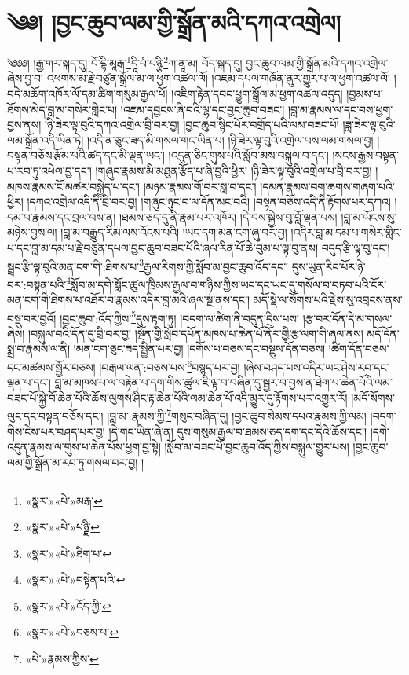 \chapter{༄༅། །བྱང་ཆུབ་ལམ་གྱི་སྒྲོན་མའི་དཀའ་འགྲེལ།}༄༅༅། །རྒྱ་གར་སྐད་དུ། བོ་དྷི་མཱརྒ་\footnote{«སྣར་»«པེ་»མརྒ་}དཱི་པཾ་པཉྩི་\footnote{«སྣར་»«པེ་»པཉྫི་}ཀ་ནཱ་མ། བོད་སྐད་དུ། བྱང་ཆུབ་ལམ་གྱི་སྒྲོན་མའི་དཀའ་འགྲེལ་ཞེས་བྱ་བ། འཕགས་མ་རྗེ་བཙུན་སྒྲོལ་མ་ལ་ཕྱག་འཚལ་ལོ། །འཇམ་དཔལ་གཞོན་ནུར་གྱུར་པ་ལ་ཕྱག་འཚལ་ལོ། །བདེ་མཆོག་འཁོར་ལོ་དམ་ཚིག་གསུམ་རྒྱལ་པོ། །འཇིག་རྟེན་དབང་ཕྱུག་སྒྲོལ་མ་ཕྱག་འཚལ་འདུད། །བྱམས་པ་ཐོགས་མེད་བླ་མ་གསེར་གླིང་པ། །འཇམ་དབྱངས་ཞི་བའི་ལྷ་དང་བྱང་ཆུབ་བཟང་། །བླ་མ་རྣམས་ལ་དང་བས་ཕྱག་བྱས་ནས། །ཉི་ཟེར་ལྟ་བུའི་དཀའ་འགྲེལ་བྲི་བར་བྱ། །བྱང་ཆུབ་སྙིང་པོར་བགྲོད་པའི་ལམ་བཟང་པོ། །ཟླ་ཟེར་ལྟ་བུའི་ལམ་སྒྲོན་འདི་ཡིན་ཏེ། །འདི་ན་ཅུང་ཟད་མི་གསལ་གང་ཡིན་པ། །ཉི་ཟེར་ལྟ་བུའི་འགྲེལ་པས་ལམ་གསལ་བྱ། །བསྟན་བཅོས་རྩོམ་པའི་ཚད་དང་མི་ལྡན་ཡང་། །འདུན་ཅིང་གུས་པའི་སློབ་མས་བསྐུལ་བ་དང་། །སངས་རྒྱས་བསྟན་པ་རབ་ཏུ་འཕེལ་བྱ་དང་། །གཞུང་རྣམས་མི་མཐུན་རྩོད་པ་ཞི་བྱའི་ཕྱིར། །ཉི་ཟེར་ལྟ་བུའི་འགྲེལ་པ་བྲི་བར་བྱ། །མཁས་རྣམས་ངོ་མཚར་བསྐྱེད་པ་དང་། །མཉམ་རྣམས་གོ་བར་སླ་བ་དང་། །དམན་རྣམས་བག་ཆགས་གཞག་པའི་ཕྱིར། །དཀའ་འགྲེལ་འདི་ནི་བྲི་བར་བྱ། །གཞུང་ཉུང་བ་ལ་དོན་མང་བའི། །བསྟན་བཅོས་འདི་ནི་རྟོགས་པར་དཀའ། །དམ་པ་རྣམས་དང་བྲལ་བས་ན། །ཐམས་ཅད་དུ་ནི་རྣམ་པར་འཁོར། །དེ་བས་སྐྱེས་བུ་བློ་ལྡན་པས། །བླ་མ་ཡོངས་སུ་མཉེས་བྱས་ལ། །བླ་མ་བརྒྱུད་རིམ་ལས་འོངས་པའི། །ཡང་དག་མན་ངག་ཞུ་བར་བྱ། །འདིར་བླ་མ་དམ་པ་གསེར་གླིང་པ་དང་བླ་མ་དམ་པ་རྗེ་བཙུན་དཔལ་བྱང་ཆུབ་བཟང་པོའི་ཞལ་རིན་པོ་ཆེ་བུམ་པ་ལྟ་བུ་ནས། བདུད་རྩི་ལྟ་བུ་དང་། སྦྲང་རྩི་ལྟ་བུའི་མན་ངག་གི་:ཐིགས་པ་\footnote{«སྣར་»«པེ་»ཐིག་པ་}རྒྱལ་རིགས་ཀྱི་སློབ་མ་བྱང་ཆུབ་འོད་དང་། དུས་ཡུན་རིང་པོར་ཉེ་བར་:བསྟན་པའི་\footnote{«སྣར་»«པེ་»བསྟེན་པའི་}སློབ་མ་དགེ་སློང་ཚུལ་ཁྲིམས་རྒྱལ་བ་གཉིས་ཀྱིས་ཡང་དང་ཡང་དུ་གསོལ་བ་བཏབ་པའི་ངོར་མན་ངག་གི་ཐིགས་པ་འཐོར་བ་རྣམས་འདིར་བླ་མའི་ཞལ་སྔ་ནས་དང་། མདོ་སྡེ་ལ་སོགས་པའི་རྗེས་སུ་འབྲངས་ནས་བསྡུ་བར་བྱའོ། །བྱང་ཆུབ་:འོད་ཀྱིས་\footnote{«སྣར་»«པེ་»འོད་ཀྱི་}དུས་རྟག་ཏུ། །བདག་ལ་ཚིག་ནི་བདུན་དྲིས་པས། །རྩ་བར་དོན་དེ་མ་གསལ་ཞེས། །བསྐུལ་བའི་དོན་དུ་བྲི་བར་བྱ། །སྔོན་གྱི་སློབ་དཔོན་མཁས་པ་ཆེན་པོ་ནོར་གྱི་རྩ་ལག་གི་ཞལ་ནས། མདོ་དོན་སྨྲ་བ་རྣམས་ལ་ནི། །མན་ངག་ཅུང་ཟད་སྦྱིན་པར་བྱ། །དགོས་པ་བཅས་དང་བསྡུས་དོན་བཅས། །ཚིག་དོན་བཅས་དང་མཚམས་སྦྱོར་བཅས། །བརྒལ་ལན་:བཅས་པས་\footnote{«སྣར་»«པེ་»བཅས་པ་}བསྙད་པར་བྱ། །ཞེས་བཤད་པས་འདིར་ཡང་ཤེས་རབ་དང་ལྡན་པ་དང་། བླ་མ་མཁས་པ་ལ་བརྟེན་པ་དག་གིས་ཚུལ་ཇི་ལྟ་བ་བཞིན་དུ་སྦྱར་བ་བྱས་ན་ཐེག་པ་ཆེན་པོའི་ལམ་བཟང་པོ་སྐྱེ་བོ་ཆེན་པོའི་ཆོས་ལུགས་ཤིང་རྟ་ཆེན་པོའི་ལམ་ཆེན་པོ་འདི་མྱུར་དུ་རྟོགས་པར་འགྱུར་རོ། །མདོ་སོགས་ལུང་དང་བསྟན་བཅོས་དང་། །བླ་མ་:རྣམས་ཀྱི་\footnote{«པེ་»རྣམས་ཀྱིས་}གསུང་བཞིན་དུ། །བྱང་ཆུབ་སེམས་དཔའ་རྣམས་ཀྱི་ལམ། །བདག་གིས་ངེས་པར་བཤད་པར་བྱ། །དེ་གང་ཡིན་ཞེ་ན། དུས་གསུམ་རྒྱལ་བ་ཐམས་ཅད་དག་དང་དེའི་ཆོས་དང་། །དགེ་འདུན་རྣམས་ལ་གུས་པ་ཆེན་པོས་ཕྱག་བྱ་སྟེ། །སློབ་མ་བཟང་པོ་བྱང་ཆུབ་འོད་ཀྱིས་བསྐུལ་གྱུར་པས། །བྱང་ཆུབ་ལམ་གྱི་སྒྲོན་མ་རབ་ཏུ་གསལ་བར་བྱ། །
